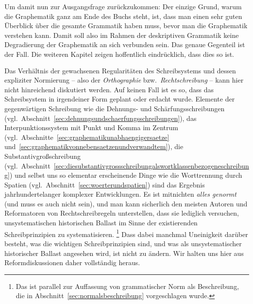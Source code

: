Um damit nun zur Ausgangsfrage zurückzukommen:
Der einzige Grund, warum die Graphematik ganz am Ende des Buchs steht, ist, dass man einen sehr guten Überblick über die gesamte Grammatik haben muss, bevor man die Graphematik verstehen kann.
Damit soll also im Rahmen der deskriptiven Grammatik keine Degradierung der Graphematik an sich verbunden sein.
Das genaue Gegenteil ist der Fall.
Die weiteren Kapitel zeigen hoffentlich eindrücklich, dass dies so ist.

Das Verhältnis der gewachsenen Regularitäten des Schreibsystems und dessen expliziter Normierung -- also der \textit{Orthographie} bzw.\ \textit{Rechtschreibung} -- kann hier nicht hinreichend diskutiert werden.
Auf keinen Fall ist es so, dass das Schreibsystem in irgendeiner Form geplant oder erdacht wurde.
Elemente der gegenwärtigen Schreibung wie die Dehnungs- und Schärfungsschreibungen (vgl.\ Abschnitt~\ref{sec:dehnungsundschaerfungsschreibungen}), das Interpunktionssystem mit Punkt und Komma im Zentrum (vgl.\ Abschnitte~\ref{sec:graphematikunabhaengigersaetze} und~\ref{sec:graphematikvonnebensaetzenundverwandtem}), die Substantivgroßschreibung (vgl.\ Abschnitt~\ref{sec:diesubstantivgrossschreibungalswortklassenbezogeneschreibung}) und selbst uns so elementar erscheinende Dinge wie die Worttrennung durch Spatien (vgl.\ Abschnitt~\ref{sec:woerterundspatien}) sind das Ergebnis jahrhundertelanger komplexer Entwicklungen.
Es ist mitnichten \textit{alles genormt} (und muss es auch nicht sein), und man kann sicherlich den meisten Autoren und Reformatoren von Rechtschreibregeln unterstellen, dass sie lediglich versuchen, unsystematischen historischen Ballast im Sinne der existierenden Schreibprinzipien zu systematisieren.%
\footnote{Das ist parallel zur Auffassung von grammatischer Norm als Beschreibung, die in Abschnitt~\ref{sec:normalsbeschreibung} vorgeschlagen wurde.}
Dass dabei manchmal Uneinigkeit darüber besteht, was die wichtigen Schreibprinzipien sind, und was als unsystematischer historischer Ballast angesehen wird, ist nicht zu ändern.
Wir halten uns hier aus Reformdiskussionen daher vollständig heraus.

